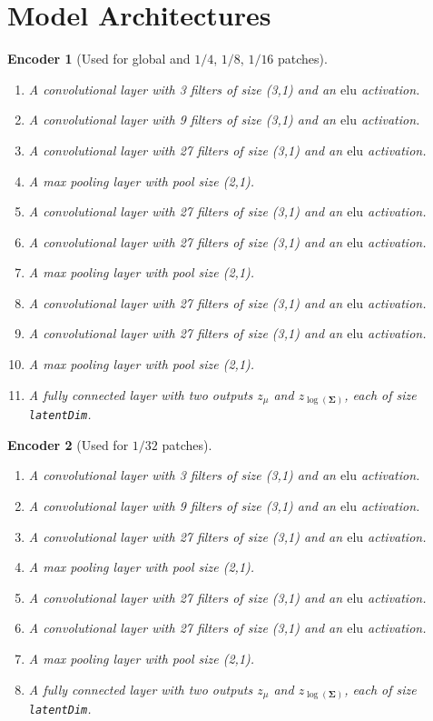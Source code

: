\documentclass[final,3p]{elsarticle}
\theoremstyle{break}
\newtheorem{encoder}{Encoder}
\newcommand{\bb}[1]{\mathbf{#1}}
\begin{document}

\appendix
\section{Model Architectures}
\begin{encoder}[Used for global and $1/4$, $1/8$, $1/16$ patches]\label{model:e_correct}
\begin{enumerate}
    \item A convolutional layer with 3 filters of size (3,1) and an $\mathrm{elu}$ activation.
    \item A convolutional layer with 9 filters of size (3,1) and an $\mathrm{elu}$ activation.
    \item A convolutional layer with 27 filters of size (3,1) and an $\mathrm{elu}$ activation.
 	\item A max pooling layer with pool size (2,1).
	\item A convolutional layer with 27 filters of size (3,1) and an $\mathrm{elu}$ activation.
	\item A convolutional layer with 27 filters of size (3,1) and an $\mathrm{elu}$ activation.
	\item A max pooling layer with pool size (2,1).
	\item A convolutional layer with 27 filters of size (3,1) and an $\mathrm{elu}$ activation.
	\item A convolutional layer with 27 filters of size (3,1) and an $\mathrm{elu}$ activation.
	\item A max pooling layer with pool size (2,1).
	\item A fully connected layer with two outputs $z_{\mu}$ and $z_{\log(\bb{\Sigma})}$, each of size {\tt latentDim}.
\end{enumerate}
\end{encoder}
\begin{encoder}[Used for $1/32$ patches]\label{model:e_correct_32}
\begin{enumerate}
    \item A convolutional layer with 3 filters of size (3,1) and an $\mathrm{elu}$ activation.
    \item A convolutional layer with 9 filters of size (3,1) and an $\mathrm{elu}$ activation.
    \item A convolutional layer with 27 filters of size (3,1) and an $\mathrm{elu}$ activation.
 	\item A max pooling layer with pool size (2,1).
	\item A convolutional layer with 27 filters of size (3,1) and an $\mathrm{elu}$ activation.
	\item A convolutional layer with 27 filters of size (3,1) and an $\mathrm{elu}$ activation.
	\item A max pooling layer with pool size (2,1).
	\item A fully connected layer with two outputs $z_{\mu}$ and $z_{\log(\bb{\Sigma})}$, each of size {\tt latentDim}.
\end{enumerate}
\end{encoder}
\end{document}
